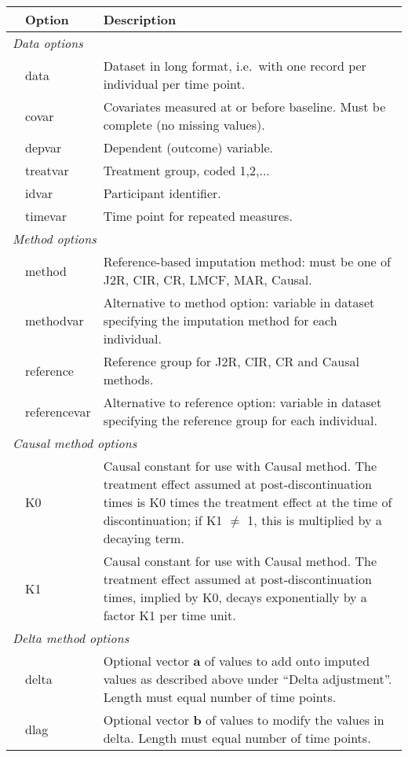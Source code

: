\begin{tabular}{llp{.8\linewidth}}\hline
& Option & Description \\ \hline
\multicolumn{3}{l}{\em Data options} \\
& data 	&	 Dataset in long format, i.e.\ with one record per individual per time point. \\
& covar 	&	 Covariates measured at or before baseline. Must be complete (no missing values).	\\
& depvar 	&	 Dependent (outcome) variable.	\\
& treatvar 	&	 Treatment group, coded 1,2,...	\\
& idvar 	&	 Participant identifier.	\\
& timevar 	&	 Time point for repeated measures. \\

\multicolumn{3}{l}{\em Method options} \\
& method 	&	 Reference-based imputation method: must be one of J2R, CIR, CR, LMCF, MAR, Causal.	\\
& methodvar 	&	 Alternative to method option: variable in dataset specifying the imputation method  for each individual. \\
& reference 	&	 Reference group for J2R, CIR, CR and Causal methods. \\
& referencevar 	&	 Alternative to reference option: variable in dataset specifying the reference group for each individual. \\

\multicolumn{3}{l}{\em Causal method options} \\
& K0 	&	 Causal constant for use with Causal method. The treatment effect assumed at post-discontinuation times is K0 times the treatment effect at the time of discontinuation; if K1 $\ne$ 1, this is multiplied by a decaying term. \\
& K1 	&	 Causal constant for use with Causal method. The treatment effect assumed at post-discontinuation times, implied by K0, decays exponentially by a factor K1 per time unit. \\

\multicolumn{3}{l}{\em Delta method options}\\
& delta 	&	 Optional vector $\boldsymbol{a}$ of values to add onto imputed values as described above under ``Delta adjustment''. Length must equal number of time points.\\
& dlag 	&	 Optional vector $\boldsymbol{b}$ of values to modify the values in delta. Length must equal number of time points. \\


\end{tabular}
